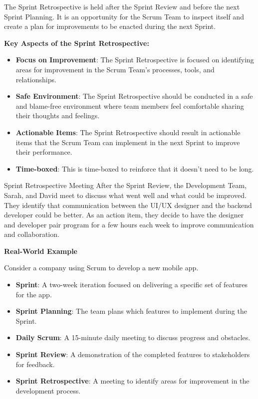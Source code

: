 The Sprint Retrospective is held after the Sprint Review and before the next
Sprint Planning. It is an opportunity for the Scrum Team to inspect itself and
create a plan for improvements to be enacted during the next Sprint.

\textbf{Key Aspects of the Sprint Retrospective:}

\begin{itemize}
  \item \textbf{Focus on Improvement}: The Sprint Retrospective is focused on identifying areas for improvement in the Scrum Team's processes, tools, and relationships.
  \item \textbf{Safe Environment}: The Sprint Retrospective should be conducted in a safe and blame-free environment where team members feel comfortable sharing their thoughts and feelings.
  \item \textbf{Actionable Items}: The Sprint Retrospective should result in actionable items that the Scrum Team can implement in the next Sprint to improve their performance.
  \item \textbf{Time-boxed}: This is time-boxed to reinforce that it doesn't need to be long.
\end{itemize}

\begin{examplecard}{Sprint Retrospective Meeting}
  After the Sprint Review, the Development Team, Sarah, and David meet to discuss what went well and what could be improved. They identify that communication between the UI/UX designer and the backend developer could be better. As an action item, they decide to have the designer and developer pair program for a few hours each week to improve communication and collaboration.
\end{examplecard}

\textbf{Real-World Example}

Consider a company using Scrum to develop a new mobile app.

\begin{itemize}
  \item \textbf{Sprint}: A two-week iteration focused on delivering a specific set of features for the app.
  \item \textbf{Sprint Planning}: The team plans which features to implement during the Sprint.
  \item \textbf{Daily Scrum}: A 15-minute daily meeting to discuss progress and obstacles.
  \item \textbf{Sprint Review}: A demonstration of the completed features to stakeholders for feedback.
  \item \textbf{Sprint Retrospective}: A meeting to identify areas for improvement in the development process.
\end{itemize}

